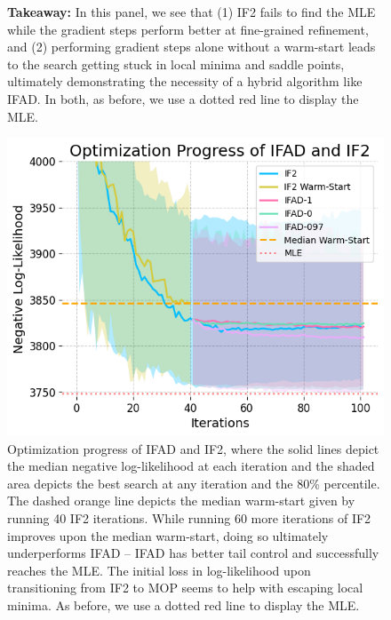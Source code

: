 \documentclass{article}
\begin{document}
\begin{figure}[ht]
{    \textbf{Takeaway:} In this panel, we see that (1) IF2 fails to find the MLE while the gradient steps perform better at fine-grained refinement, and (2) performing gradient steps alone without a warm-start leads to the search getting stuck in local minima and saddle points, ultimately demonstrating the necessity of a hybrid algorithm like IFAD.
    In both, as before, we use a dotted red line to display the MLE. }
    \label{fig:boxplot-search}
\end{figure}

\begin{figure}[htbp!]
    \centering
    \includegraphics[scale=0.7]{../imgs/095/optim.png}
    \caption{Optimization progress of IFAD and IF2, where the solid lines depict the median negative log-likelihood at each iteration and the shaded area depicts the best search at any iteration and the 80\% percentile. The dashed orange line depicts the median warm-start given by running 40 IF2 iterations. While running 60 more iterations of IF2 improves upon the median warm-start, doing so ultimately underperforms IFAD -- IFAD has better tail control and successfully reaches the MLE. The initial loss in log-likelihood upon transitioning from IF2 to MOP seems to help with escaping local minima. 
    As before, we use a dotted red line to display the MLE. }
    \label{fig:optim}
\end{figure}
\end{document}
